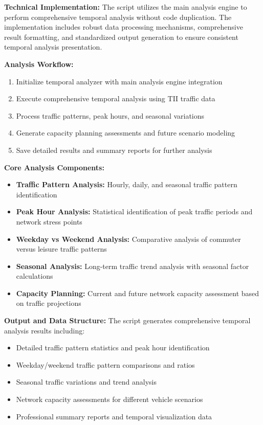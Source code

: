 \documentclass[MScCS]{uccthesis}
\begin{document}
\textbf{Technical Implementation:} The script utilizes the main analysis engine to perform comprehensive temporal analysis without code duplication. The implementation includes robust data processing mechanisms, comprehensive result formatting, and standardized output generation to ensure consistent temporal analysis presentation.

\textbf{Analysis Workflow:}
\begin{enumerate}
\item Initialize temporal analyzer with main analysis engine integration
\item Execute comprehensive temporal analysis using TII traffic data
\item Process traffic patterns, peak hours, and seasonal variations
\item Generate capacity planning assessments and future scenario modeling
\item Save detailed results and summary reports for further analysis
\end{enumerate}

\textbf{Core Analysis Components:}
\begin{itemize}
\item \textbf{Traffic Pattern Analysis:} Hourly, daily, and seasonal traffic pattern identification
\item \textbf{Peak Hour Analysis:} Statistical identification of peak traffic periods and network stress points
\item \textbf{Weekday vs Weekend Analysis:} Comparative analysis of commuter versus leisure traffic patterns
\item \textbf{Seasonal Analysis:} Long-term traffic trend analysis with seasonal factor calculations
\item \textbf{Capacity Planning:} Current and future network capacity assessment based on traffic projections
\end{itemize}

\textbf{Output and Data Structure:} The script generates comprehensive temporal analysis results including:
\begin{itemize}
\item Detailed traffic pattern statistics and peak hour identification
\item Weekday/weekend traffic pattern comparisons and ratios
\item Seasonal traffic variations and trend analysis
\item Network capacity assessments for different vehicle scenarios
\item Professional summary reports and temporal visualization data
\end{itemize}
\end{document}
